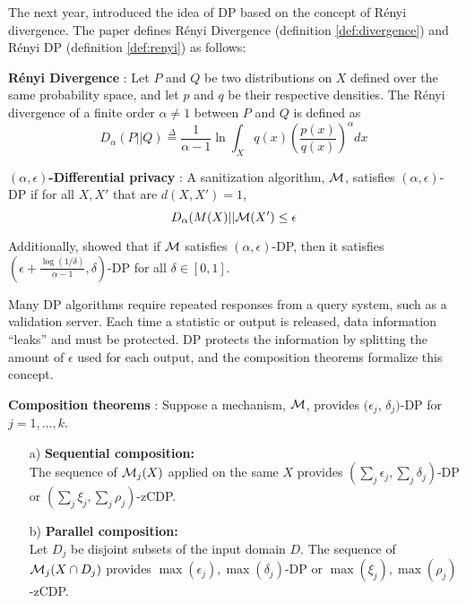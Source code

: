 The next year, \citet{mironov2017renyi} introduced the idea of DP based on the concept of R\'enyi divergence. The paper defines R\'enyi Divergence (definition \ref{def:divergence}) and R\'enyi DP (definition \ref{def:renyi}) as follows:

\begin{defn}\label{def:divergence} \textbf{R\'enyi Divergence} \citep{renyi1961measures}: Let $P$ and $Q$ be two distributions on $X$ defined over the same probability space, and let $p$ and $q$ be their respective densities. The R\'enyi divergence of a finite order $\alpha\neq1$ between $P$ and $Q$ is defined as
    \begin{equation}
        D_\alpha(P||Q)\stackrel{\Delta}{=}\frac{1}{\alpha-1}\ln\int_X q(x)\left(\frac{p(x)}{q(x)}\right)^\alpha dx
    \end{equation}
\end{defn}

\begin{defn}\label{def:renyi} \textbf{$(\alpha, \epsilon)$-Differential privacy} \citep{mironov2017renyi}: A sanitization algorithm, $\mathcal{M}$, satisfies $(\alpha, \epsilon)$-DP if for all $X, X'$ that are $d(X,X')=1$,
    \begin{equation}
        D_\alpha(M(X)||\mathcal{M}(X')\leq\epsilon
    \end{equation}
\end{defn}

Additionally, \citet{mironov2017renyi} showed that if $\mathcal{M}$ satisfies $(\alpha,\epsilon)$-DP, then it satisfies $\left(\epsilon + \frac{\log(1/\delta)}{\alpha-1}, \delta \right)$-DP for all $\delta\in[0,1]$.

Many DP algorithms require repeated responses from a query system, such as a validation server. Each time a statistic or output is released, data information ``leaks'' and must be protected. DP protects the information by splitting the amount of $\epsilon$ used for each output, and the composition theorems formalize this concept.

\begin{thm}\label{thm:comp} \textbf{Composition theorems} \citep{mcsherry2009privacy,dwork2016concentrated,bun2016concentrated}:
Suppose a mechanism, $\mathcal{M}$, provides $(\epsilon_j$, $\delta_j)$-DP for $j=1,\ldots,k$.
  \begin{itemize}\setlength{\itemindent}{15pt}
  \item[a)] \textbf{Sequential composition:}\\
    The sequence of $\mathcal{M}_j(X)$ applied on the same $X$ provides $(\sum_j\epsilon_j,\sum_j\delta_j)$-DP or $(\sum_j\xi_j,\sum_j\rho_j)$-zCDP.
  \item[b)] \textbf{Parallel composition:}\\
    Let  $D_j$ be disjoint subsets of the input domain $D$. The sequence of $\mathcal{M}_j(X\cap D_j)$ provides $\max(\epsilon_j), \max(\delta_j)$-DP or $\max(\xi_j), \max(\rho_j)$-zCDP.
  \end{itemize}
\end{thm}

